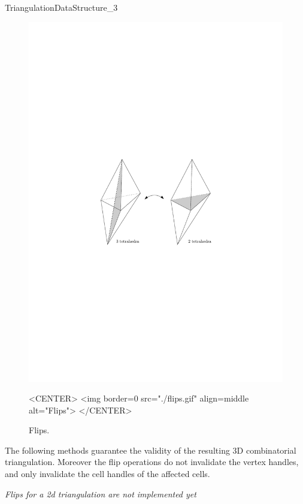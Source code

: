 \begin{ccRefConcept}{TriangulationDataStructure_3}
\begin{figure}
\begin{ccTexOnly}
\begin{center} 
\includegraphics{TriangulationDS_3/flips}
\end{center}
\end{ccTexOnly}
\caption{Flips.
\label{TDS3-fig-flips}}
\begin{ccHtmlOnly}
<CENTER>
<img border=0 src="./flips.gif" align=middle alt="Flips">
</CENTER>
\end{ccHtmlOnly}
\end{figure} 

The following methods guarantee the validity of the resulting 3D
combinatorial triangulation.  Moreover the flip operations do not
invalidate the vertex handles, and only invalidate the cell
handles of the affected cells.

\textit{Flips for a 2d triangulation are not implemented yet}


\end{ccRefConcept}
